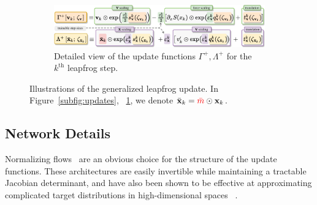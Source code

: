 \documentclass[a4paper,11pt]{article}
\newcommand{\maskbar}{\textcolor{red}{\bar{m}}}
\begin{document}
\begin{figure}[htpb]
\begin{subfigure}[t]{\linewidth}
        \includegraphics[width=\linewidth]{assets/network_functions.pdf}
        \caption{\label{subfig:network_fns}Detailed view of the update
        functions \(\Gamma^{+}, \Lambda^{+}\) for the \(k^{\mathrm{th}}\)
    leapfrog step.}
    \end{subfigure}
    \caption{\label{fig:networks}Illustrations of the generalized
        leapfrog update. In Figure~\ref{subfig:updates},
        ~\ref{subfig:network_fns}, we denote \(\bar{\mathbf{x}}_{k} =
    \maskbar\odot \mathbf{x}_{k}\).}
\end{figure}
%
\subsection{\label{subsec:networks}Network Details}
%
Normalizing flows~\cite{2016arXiv160508803D} are an obvious choice for the
structure of the update functions.
%
These architectures are easily invertible while maintaining a tractable
Jacobian determinant, and have also been shown to be effective at approximating
complicated target distributions in high-dimensional spaces ~\cite{%
    Foreman:2021ljl,%
    Li2021ANN,%
    Foreman:2021ixr,%
    Kanwar:2020xzo,%
    2016arXiv160508803D,%
    Albergo:2021vyo,%
    Boyda:2020hsi,%
    2017arXiv171109268L,%
    Neklyudov2020OrbitalM,%
    neklyudovInvolutiveMcmcUnifying2020,%
    wehenkelYouSayNormalizing2020,%
    liNeuralNetworkRenormalization2018a,%
    Nicoli:2020njz%
}.
\end{document}
